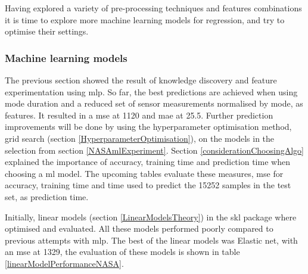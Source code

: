 \documentclass[english, a4paper]{report}
\begin{document}
{{{{                Having explored a variety of pre-processing techniques and features combinations it is time to explore more machine learning models for regression, and try to optimise their settings.
            }
            
            \subsubsection{Machine learning models}
            {
                The previous section showed the result of knowledge discovery and feature experimentation using \gls{mlp}. So far, the best predictions are achieved when using mode duration and a reduced set of sensor measurements normalised by mode, as features. It resulted in a \gls{mse} at 1120 and \gls{mae} at 25.5. Further prediction improvements will be done by using the hyperparameter optimisation method, grid search (section \ref{HyperparameterOptimisation}), on the models in the selection from section \ref{NASAmlExperiment}. Section \ref{considerationChoosingAlgo} explained the importance of accuracy, training time and prediction time when choosing a \gls{ml} model. The upcoming tables evaluate these measures, \gls{mse} for accuracy, training time and time used to predict the 15252 samples in the test set, as prediction time.  
                \par
                Initially, linear models (section \ref{LinearModelsTheory}) in the \gls{skl} package where optimised and evaluated. All these models performed poorly compared to previous attempts with \gls{mlp}. The best of the linear models was Elastic net, with an \gls{mse} at 1329, the evaluation of these models is shown in table \ref{linearModelPerformanceNASA}.
                
}}}}
\end{document}
